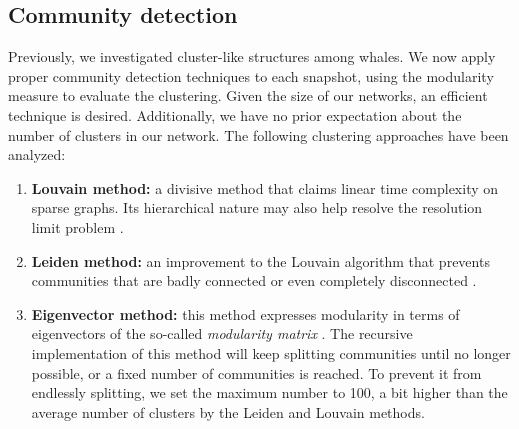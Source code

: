 \documentclass[10pt,a4paper]{article}
\begin{document}
\begin{multicols}{2}
\section{Community detection}
Previously, we investigated cluster-like structures among whales. We now apply proper community detection techniques to each snapshot, using the modularity measure to evaluate the clustering. Given the size of our networks, an efficient technique is desired. Additionally, we have no prior expectation about the number of clusters in our network. The following clustering approaches have been analyzed: 
\begin{enumerate}
\item{\textbf{Louvain method:} a divisive method that claims linear time complexity on sparse graphs. Its hierarchical nature may also help resolve the resolution limit problem \cite{Blondel_2008}.}
\item{\textbf{Leiden method:} an improvement to the Louvain algorithm that prevents communities that are badly connected or even completely disconnected \cite{leiden}.}
\item{\textbf{Eigenvector method:} this method expresses modularity in terms of eigenvectors of the so-called \textit{modularity matrix} \cite{Newman_2006}. The recursive implementation of this method will keep splitting communities until no longer possible, or a fixed number of communities is reached. To prevent it from endlessly splitting, we set the maximum number to 100, a bit higher than the average number of clusters by the Leiden and Louvain methods.}
\end{enumerate}


\end{multicols}
\end{document}
